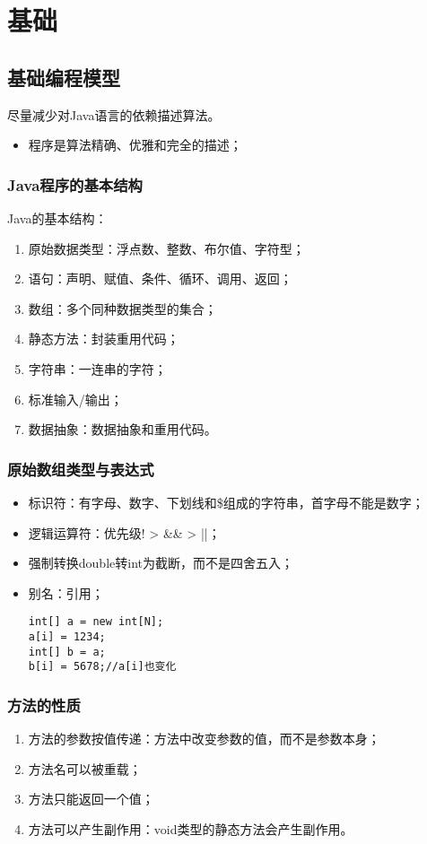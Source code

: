 \chapter{基础}
\section{基础编程模型}
尽量减少对Java语言的依赖描述算法。
\begin{itemize}
	\item 程序是算法精确、优雅和完全的描述；
\end{itemize}
\subsection{Java程序的基本结构}
Java的基本结构：
\begin{enumerate}
	\item 原始数据类型：浮点数、整数、布尔值、字符型；
	\item 语句：声明、赋值、条件、循环、调用、返回；
	\item 数组：多个同种数据类型的集合；
	\item 静态方法：封装重用代码；
	\item 字符串：一连串的字符；
	\item 标准输入/输出；
	\item 数据抽象：数据抽象和重用代码。
\end{enumerate}
\subsection{原始数组类型与表达式}
\begin{itemize}
	\item 标识符：有字母、数字、下划线和\$组成的字符串，首字母不能是数字；
	\item 逻辑运算符：优先级! > \&\& > ||；
	\item 强制转换double转int为截断，而不是四舍五入；
	\item 别名：引用；
	\begin{lstlisting}
int[] a = new int[N];
a[i] = 1234;
int[] b = a;
b[i] = 5678;//a[i]也变化
	\end{lstlisting}
\end{itemize}
\subsection{方法的性质}
\begin{enumerate}
	\item 方法的参数按值传递：方法中改变参数的值，而不是参数本身；
	\item 方法名可以被重载；
	\item 方法只能返回一个值；
	\item 方法可以产生副作用：void类型的静态方法会产生副作用。
\end{enumerate}
